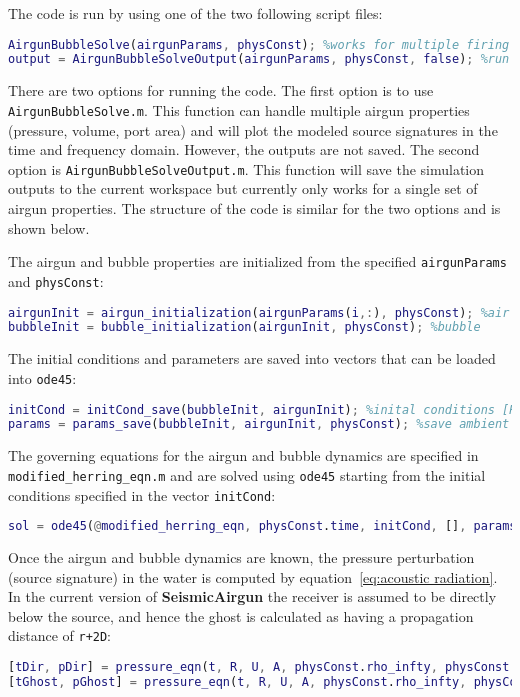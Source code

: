 \documentclass[10pt]{article}
\begin{document}
The code is run by using one of the two following script files:
\begin{lstlisting}[language=Matlab]
AirgunBubbleSolve(airgunParams, physConst); %works for multiple firing configurations
output = AirgunBubbleSolveOutput(airgunParams, physConst, false); %run solver and saves outputs (only works for a single firing configuration). True or false flag determines if solution is plotted or not.
\end{lstlisting}
There are two options for running the code. The first option is to use \texttt{AirgunBubbleSolve.m}. This function can handle multiple airgun properties (pressure, volume, port area) and will plot the modeled source signatures in the time and frequency domain. However, the outputs are not saved. The second option is \texttt{AirgunBubbleSolveOutput.m}. This function will save the simulation outputs to the current workspace but currently only works for a single set of airgun properties. The structure of the code is similar for the two options and is shown below.

The airgun and bubble properties are initialized from the specified \texttt{airgunParams} and \texttt{physConst}:
\begin{lstlisting}[language=Matlab]
airgunInit = airgun_initialization(airgunParams(i,:), physConst); %air gun
bubbleInit = bubble_initialization(airgunInit, physConst); %bubble
\end{lstlisting}

The initial conditions and parameters are saved into vectors that can be loaded into \texttt{ode45}:
\begin{lstlisting}[language=Matlab]
initCond = initCond_save(bubbleInit, airgunInit); %inital conditions [R,U,mb,Tb,pa,ma]
params = params_save(bubbleInit, airgunInit, physConst); %save ambient water, airgun and bubble parameters into vector 
\end{lstlisting}

The governing equations for the airgun and bubble dynamics are specified in \texttt{modified\-\_herring\-\_eqn.m} and are solved using \texttt{ode45} starting from the initial conditions specified in the vector \texttt{initCond}:
\begin{lstlisting}[language=Matlab]
sol = ode45(@modified_herring_eqn, physConst.time, initCond, [], params);
\end{lstlisting}

Once the airgun and bubble dynamics are known, the pressure perturbation (source signature) in the water is computed by equation~\ref{eq:acoustic radiation}. In the current version of {\bf SeismicAirgun} the receiver is assumed to be directly below the source, and hence the ghost is calculated as having a propagation distance of \texttt{r+2D}:
\begin{lstlisting}[language=Matlab]
[tDir, pDir] = pressure_eqn(t, R, U, A, physConst.rho_infty, physConst.c_infty, physConst.r); %direct arrival
[tGhost, pGhost] = pressure_eqn(t, R, U, A, physConst.rho_infty, physConst.c_infty, physConst.r + 2*physConst.depth); %ghost arrival
\end{lstlisting}
\end{document}
